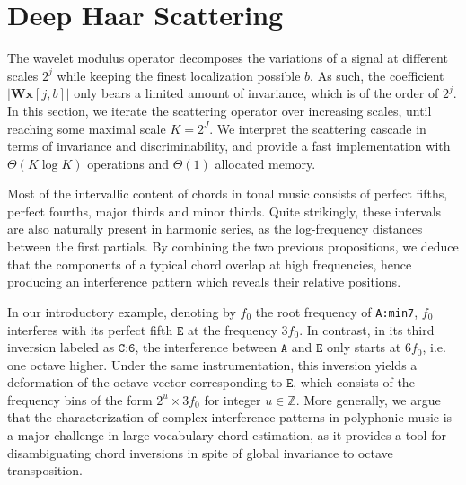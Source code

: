 \documentclass{article}
\makeatletter
\newcommand*{\ie}{i.e.\@\xspace}
\makeatother
\begin{document}


\section{Deep Haar Scattering}\label{sec:scattering}
The wavelet modulus operator decomposes the variations of a signal at
different scales $2^j$ while keeping the finest localization possible $b$.
As such, the coefficient $\vert \mathbf{W} \boldsymbol{x}[j, b] \vert$
only bears a limited amount of invariance, which is of the order
of $2^j$.
In this section, we iterate the scattering operator over increasing scales,
until reaching some maximal scale $K=2^J$.
We interpret the scattering cascade in terms of invariance and discriminability,
and provide a fast implementation with $\Theta(K \log K)$ operations
and $\Theta(1)$ allocated memory.

Most of the intervallic content of chords in tonal music consists of perfect fifths,
perfect fourths, major thirds and minor thirds.
Quite strikingly, these intervals are also naturally present in harmonic series,
as the log-frequency distances between the first partials.
By combining the two previous propositions, we deduce that
the components of a typical chord overlap at high frequencies,
hence producing an interference pattern which reveals their relative positions.

In our introductory example, denoting by $f_0$ the root frequency of \texttt{A:min7},
$f_0$ interferes with its perfect fifth $\texttt{E}$ at the frequency $3 f_0$.
In contrast, in its third inversion labeled as $\texttt{C:6}$, the interference
between $\texttt{A}$ and $\texttt{E}$ only starts at $6 f_0$, \ie one octave higher.
Under the same instrumentation, this inversion yields a deformation of the
octave vector corresponding to $\texttt{E}$, which consists of the frequency bins
of the form $2^u \times 3 f_0$ for integer $u \in \mathbb{Z}$.
More generally, we argue that the characterization of complex interference patterns
in polyphonic music is a major challenge in large-vocabulary chord estimation,
as it provides a tool for disambiguating chord inversions in spite of global
invariance to octave transposition.
\end{document}
